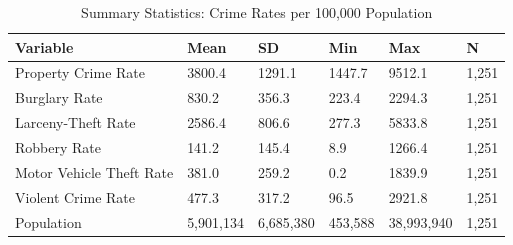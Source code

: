\begin{table}[!h]
\centering
\caption{\label{tab:sumstat}Summary Statistics: Crime Rates per 100,000 Population}
\centering
\begin{tabular}[t]{llllll}
\toprule
Variable & Mean & SD & Min & Max & N\\
\midrule
Property Crime Rate & 3800.4 & 1291.1 & 1447.7 & 9512.1 & 1,251\\
Burglary Rate & 830.2 & 356.3 & 223.4 & 2294.3 & 1,251\\
Larceny-Theft Rate & 2586.4 & 806.6 & 277.3 & 5833.8 & 1,251\\
Robbery Rate & 141.2 & 145.4 & 8.9 & 1266.4 & 1,251\\
Motor Vehicle Theft Rate & 381.0 & 259.2 & 0.2 & 1839.9 & 1,251\\
Violent Crime Rate & 477.3 & 317.2 & 96.5 & 2921.8 & 1,251\\
Population & 5,901,134 & 6,685,380 & 453,588 & 38,993,940 & 1,251\\
\bottomrule
\end{tabular}
\end{table}
